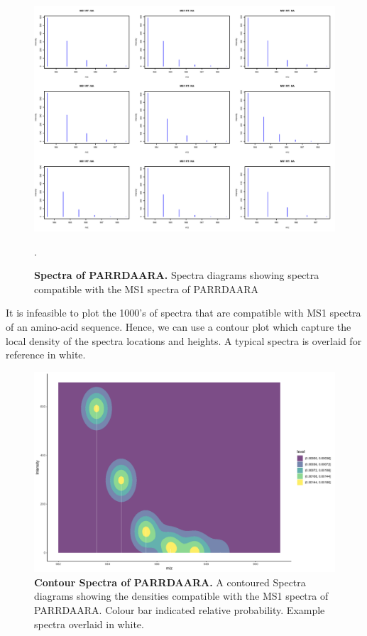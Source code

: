 \documentclass[12pt,english, journal=jpr, layout=twocolumn]{article}
\begin{document}
\begin{figure}[H]
	\centering
	\includegraphics[width =1\textwidth]{aaMS1example.pdf}
	\caption{\textbf{Spectra of PARRDAARA.} Spectra diagrams showing spectra compatible with the MS1 spectra of PARRDAARA}.
	\label{figure::figure2spectraexample}
\end{figure}

It is infeasible to plot the 1000's of spectra that are compatible with MS1 spectra of an amino-acid sequence. Hence, we can use a contour plot which capture the local density of the spectra locations and heights. A typical spectra is overlaid for reference in white.

 \begin{figure}[H]
 	\centering
 	\includegraphics[width =1\textwidth]{spectrauncertaintyplot.pdf}
 	\caption{\textbf{Contour Spectra of PARRDAARA.} A contoured Spectra diagrams showing the densities compatible with the MS1 spectra of PARRDAARA. Colour bar indicated relative probability. Example spectra overlaid in white.}
 	\label{figure::figure3spectrauncertaintyplot}
 \end{figure}

	
\end{document}

